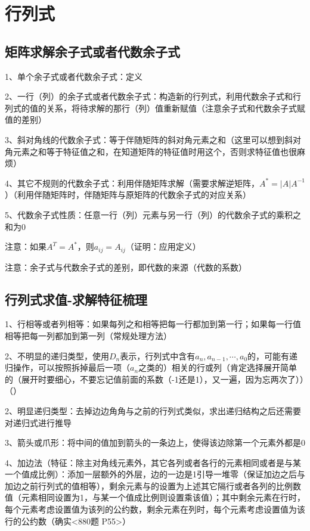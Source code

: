 \chapter{行列式}

\section{矩阵求解余子式或者代数余子式}

1、单个余子式或者代数余子式：定义

2、一行（列）的余子式或者代数余子式：构造新的行列式，利用代数余子式和行列式的值的关系，将待求解的那行（列）值重新赋值（注意余子式和代数余子式赋值的差别）

3、斜对角线的代数余子式：等于伴随矩阵的斜对角元素之和（这里可以想到斜对角元素之和等于特征值之和，在知道矩阵的特征值时用这个，否则求特征值也很麻烦）

4、其它不规则的代数余子式：利用伴随矩阵求解（需要求解逆矩阵，$A^*=|A|A^{-1}$）（利用伴随矩阵时，伴随矩阵与原矩阵的代数余子式的对应关系）

5、代数余子式性质：任意一行（列）元素与另一行（列）的代数余子式的乘积之和为0

注意：如果$A^T=A^*$，则$a_{ij}=A_{ij}$（证明：应用定义）

注意：余子式与代数余子式的差别，即代数的来源（代数的系数）

\section{行列式求值-求解特征梳理}

1、行相等或者列相等：如果每列之和相等把每一行都加到第一行；如果每一行值相等把每一列都加到第一列（常规处理方法）

2、不明显的递归类型，使用$D_n$表示，行列式中含有$a_n,a_{n-1},\cdots,a_0$的，可能有递归操作，可以按照拆掉最后一项（$a_n$之类的）相关的行或列（肯定选择展开简单的（展开时要细心，不要忘记值前面的系数（-1还是1），又一遍，因为忘两次了））（）

2、明显递归类型：去掉边边角角与之前的行列式类似，求出递归结构之后还需要对递归式进行推导

3、箭头或爪形：将中间的值加到箭头的一条边上，使得该边除第一个元素外都是0

4、加边法（特征：除主对角线元素外，其它各列或者各行的元素相同或者是与某一个值成比例）：添加一层额外的外层，边的一边是1引导一堆零（保证加边之后与加边之前行列式的值相等），剩余元素与的设置为上述其它隔行或者各列的比例数值（元素相同设置为1，与某一个值成比例则设置乘该值）；其中剩余元素在行时，每个元素考虑设置值为该列的公约数，剩余元素在列时，每个元素考虑设置值为该行的公约数（确实<880题 P55>）

